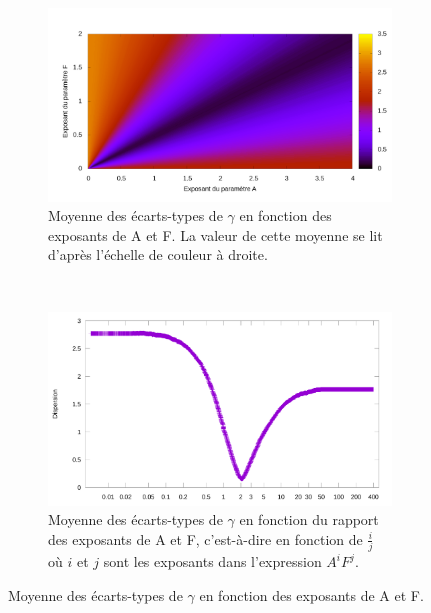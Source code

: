 	\begin{figure}[!htb]
		\begin{subfigure}[t]{0.485\textwidth}
			\centering
			\includegraphics[width=\textwidth]{figures/ch4/spread_v_af}
			\caption[Moyenne des écarts-types de $\gamma$ en fonction de $i$ et $j$.]{Moyenne des écarts-types de $\gamma$ en fonction des exposants de A et F. La valeur de cette moyenne se lit d'après l'échelle de couleur à droite.}
			\label{fig:spread_v_af}
		\end{subfigure}
		~
		\begin{subfigure}[t]{0.485\textwidth}
			\centering
			\includegraphics[width=\textwidth]{figures/ch4/spread_v_expa_over_expf}
			\caption[Moyenne des écarts-types de $\gamma$ en fonction de $i/j$.]{Moyenne des écarts-types de $\gamma$ en fonction du rapport des exposants de A et F, c'est-à-dire en fonction de $\frac{i}{j}$ où $i$ et $j$ sont les exposants dans l'expression $A^{i}F^{j}$.}
			\label{fig:spread_v_expa_over_expf}
		\end{subfigure}
		\caption[Écarts-types de $\gamma$ en fonction de $i$ et $j$]{Moyenne des écarts-types de $\gamma$ en fonction des exposants de A et F.}
		\label{fig:spread_v_af_and_ratio}
	\end{figure}
	
